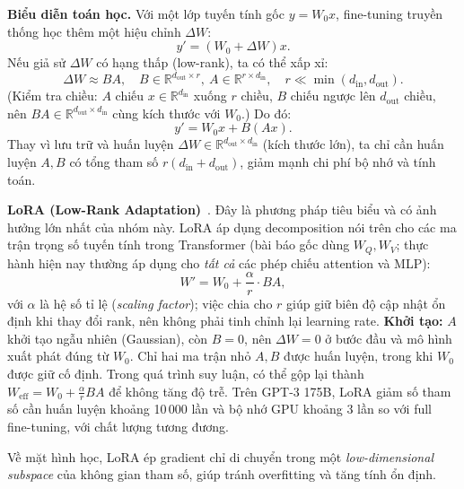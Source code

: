 \textbf{Biểu diễn toán học.}  
Với một lớp tuyến tính gốc $y = W_0 x$, fine-tuning truyền thống học thêm một hiệu chỉnh $\Delta W$:
\[
y' = (W_0 + \Delta W)x.
\]
Nếu giả sử $\Delta W$ có hạng thấp (low-rank), ta có thể xấp xỉ:
\[
\Delta W \approx B A, \quad B \in \mathbb{R}^{d_{\text{out}} \times r}, \ A \in \mathbb{R}^{r \times d_{\text{in}}}, \quad r \ll \min(d_{\text{in}}, d_{\text{out}}).
\]
(Kiểm tra chiều: $A$ chiếu $x \in \mathbb{R}^{d_{\text{in}}}$ xuống $r$ chiều, $B$ chiếu ngược lên $d_{\text{out}}$ chiều, nên $BA \in \mathbb{R}^{d_{\text{out}} \times d_{\text{in}}}$ cùng kích thước với $W_0$.) Do đó:
\[
y' = W_0 x + B (A x).
\]
Thay vì lưu trữ và huấn luyện $\Delta W \in \mathbb{R}^{d_{\text{out}} \times d_{\text{in}}}$ (kích thước lớn), ta chỉ cần huấn luyện $A,B$ có tổng tham số $r(d_{\text{in}} + d_{\text{out}})$, giảm mạnh chi phí bộ nhớ và tính toán.

\textbf{LoRA (Low-Rank Adaptation)}~\cite{hu2021lora}.
Đây là phương pháp tiêu biểu và có ảnh hưởng lớn nhất của nhóm này.
LoRA áp dụng decomposition nói trên cho các ma trận trọng số tuyến tính trong Transformer (bài báo gốc dùng $W_Q, W_V$; thực hành hiện nay thường áp dụng cho \emph{tất cả} các phép chiếu attention và MLP):
\[
W' = W_0 + \frac{\alpha}{r} \cdot B A,
\]
với $\alpha$ là hệ số tỉ lệ (\textit{scaling factor}); việc chia cho $r$ giúp giữ biên độ cập nhật ổn định khi thay đổi rank, nên không phải tinh chỉnh lại learning rate.
\textbf{Khởi tạo:} $A$ khởi tạo ngẫu nhiên (Gaussian), còn $B = 0$, nên $\Delta W = 0$ ở bước đầu và mô hình xuất phát đúng từ $W_0$.
Chỉ hai ma trận nhỏ $A, B$ được huấn luyện, trong khi $W_0$ được giữ cố định.
Trong quá trình suy luận, có thể gộp lại thành $W_{\text{eff}} = W_0 + \frac{\alpha}{r}BA$ để không tăng độ trễ.
Trên GPT-3 175B, LoRA giảm số tham số cần huấn luyện khoảng 10\,000 lần và bộ nhớ GPU khoảng 3 lần so với full fine-tuning, với chất lượng tương đương.

Về mặt hình học, LoRA ép gradient chỉ di chuyển trong một \textit{low-dimensional subspace} của không gian tham số, giúp tránh overfitting và tăng tính ổn định.

